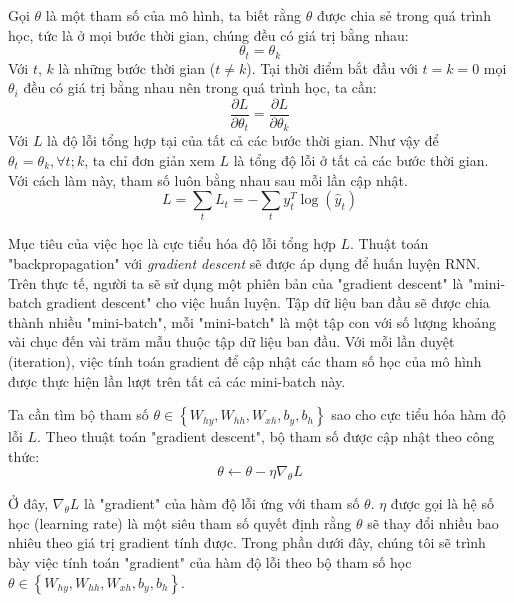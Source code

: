 Gọi $\theta$ là một tham số của mô hình, ta biết rằng $\theta$ được chia sẻ trong quá trình học, tức là ở mọi bước thời gian, chúng đều có giá trị bằng nhau:
\begin{equation} \label{weightSharing1}
\theta_t = \theta_k
\end{equation}
Với $t$, $k$ là những bước thời gian ($t \ne k$). Tại thời điểm bắt đầu với $t=k=0$ mọi $\theta_i$ đều có giá trị bằng nhau nên trong quá trình học, ta cần:
\begin{equation} \label{weightSharing2}
\frac{\partial L}{\partial \theta_t} = \frac{\partial L}{\partial \theta_k}
\end{equation}
Với $L$ là độ lỗi tổng hợp tại của tất cả các bước thời gian. Như vậy để $\theta_t = \theta_k, \forall t;k$, ta chỉ đơn giản xem $L$ là tổng độ lỗi ở tất cả các bước thời gian. Với cách làm này, tham số luôn bằng nhau sau mỗi lần cập nhật.
\begin{equation} \label{errorOfAll}
L = \sum_{t}L_t = - \sum_{t} y_t^{T} \log(\hat{y}_t) 
\end{equation}

Mục tiêu của việc học là cực tiểu hóa độ lỗi tổng hợp $L$. Thuật toán "backpropagation" với \textit{gradient descent} sẽ được áp dụng để huấn luyện RNN. Trên thực tế, người ta sẽ sử dụng một phiên bản của "gradient descent" là "mini-batch gradient descent" cho việc huấn luyện. Tập dữ liệu ban đầu sẽ được chia thành nhiều "mini-batch", mỗi "mini-batch" là một tập con với số lượng khoảng vài chục đến vài trăm mẫu thuộc tập dữ liệu ban đầu. Với mỗi lần duyệt (iteration), việc tính toán gradient để cập nhật các tham số học của mô hình được thực hiện lần lượt trên tất cả các mini-batch này.

Ta cần tìm bộ tham số $\theta \in \left\{W_{hy},W_{hh},W_{xh},b_y,b_h \right \}$ sao cho cực tiểu hóa hàm độ lỗi $L$. Theo thuật toán "gradient descent", bộ tham số được cập nhật theo công thức:
\begin{equation} \label{gradientDescentWithTheta}
\theta \leftarrow \theta - \eta \nabla_{\theta} L
\end{equation}

Ở đây, $\nabla_{\theta} L$ là "gradient" của hàm độ lỗi ứng với tham số $\theta$. $\eta$ được gọi là hệ số học (learning rate) là một siêu tham số quyết định rằng $\theta$ sẽ thay đổi nhiều bao nhiêu theo giá trị gradient tính được. Trong phần dưới đây, chúng tôi sẽ trình bày việc tính toán "gradient" của hàm độ lỗi theo bộ tham số học $\theta \in \left\{W_{hy},W_{hh},W_{xh},b_y,b_h \right \}$.

